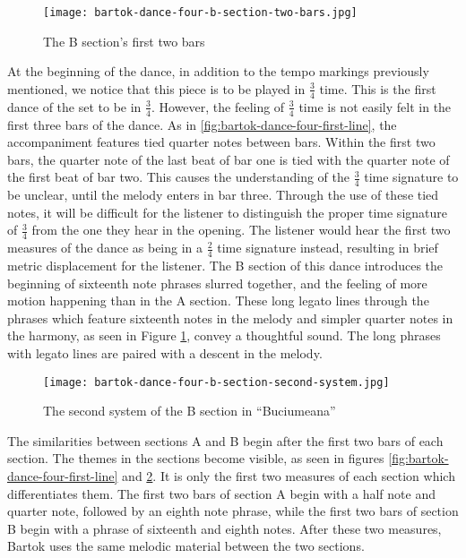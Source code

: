 \begin{figure}
  \centering
  \texttt{[image: bartok-dance-four-b-section-two-bars.jpg]}
  \caption[The first two bars of the B section in ``Buciumeana'' of Bartok's \textit{Romanian Folk Dances}, Sz. 56, BB 68]{The B section's first two bars}
  \label{fig:bartok-dance-four-b-section-two-bars}
\end{figure}

At the beginning of the dance, in addition to the tempo markings previously mentioned, we notice that this piece is to be played in $\frac{3}{4}$ time. This is the first dance of the set to be in $\frac{3}{4}$. However, the feeling of $\frac{3}{4}$ time is not easily felt in the first three bars of the dance. As in \ref{fig:bartok-dance-four-first-line}\autocite{Lung_2016}, the accompaniment features tied quarter notes between bars. Within the first two bars, the quarter note of the last beat of bar one is tied with the quarter note of the first beat of bar two. This causes the understanding of the $\frac{3}{4}$ time signature to be unclear, until the melody enters in bar three. Through the use of these tied notes, it will be difficult for the listener to distinguish the proper time signature of $\frac{3}{4}$ from the one they hear in the opening. The listener would hear the first two measures of the dance as being in a $\frac{2}{4}$ time signature instead, resulting in brief metric displacement for the listener. The B section of this dance introduces the beginning of sixteenth note phrases slurred together, and the feeling of more motion happening than in the A section. These long legato lines through the phrases which feature sixteenth notes in the melody and simpler quarter notes in the harmony, as seen in Figure \ref{fig:bartok-dance-four-b-section-two-bars}\autocite{Lung_2016}, convey a thoughtful sound. The long phrases with legato lines are paired with a descent in the melody. 

\begin{figure}
  \centering
  \texttt{[image: bartok-dance-four-b-section-second-system.jpg]}
  \caption[The second system of ``Buciumeana'' in Bartok's \textit{Romanian Folk Dances, Sz. 56, BB 88}]{The second system of the B section in ``Buciumeana''}
  \label{fig:bartok-dance-four-b-section-second-system}
\end{figure}

The similarities between sections A and B begin after the first two bars of each section. The themes in the sections become visible, as seen in figures \ref{fig:bartok-dance-four-first-line}\autocite{Lung_2016} and \ref{fig:bartok-dance-four-b-section-second-system}\autocite{Lung_2016}. It is only the first two measures of each section which differentiates them. The first two bars of section A begin with a half note and quarter note, followed by an eighth note phrase, while the first two bars of section B begin with a phrase of sixteenth and eighth notes. After these two measures, Bartok uses the same melodic material between the two sections. 

